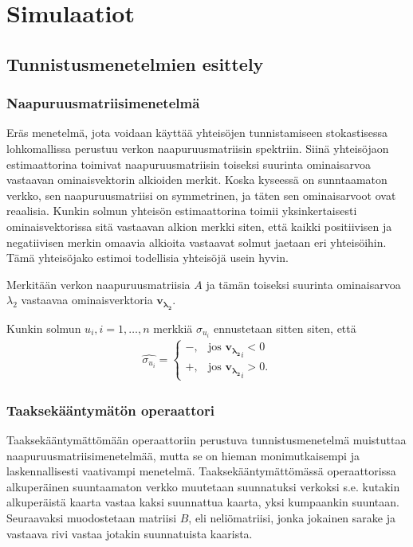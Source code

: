 \documentclass[finnish,12pt,a4paper,pdftex,sci,utf8]{aaltothesis}
\begin{document}
\section{Simulaatiot}
\subsection{Tunnistusmenetelmien esittely}
\subsubsection{Naapuruusmatriisimenetelmä}
Eräs menetelmä, jota voidaan käyttää yhteisöjen tunnistamiseen stokastisessa lohkomallissa perustuu verkon naapuruusmatriisin spektriin. Siinä yhteisöjaon estimaattorina toimivat naapuruusmatriisin toiseksi suurinta ominaisarvoa vastaavan ominaisvektorin alkioiden merkit. Koska kyseessä on sunntaamaton verkko, sen naapuruusmatriisi on symmetrinen, ja täten sen ominaisarvoot ovat reaalisia. Kunkin solmun yhteisön estimaattorina toimii yksinkertaisesti ominaisvektorissa sitä vastaavan alkion merkki siten, että kaikki positiivisen ja negatiivisen merkin omaavia alkioita vastaavat solmut jaetaan eri yhteisöihin. Tämä yhteisöjako estimoi todellisia yhteisöjä usein hyvin.

Merkitään verkon naapuruusmatriisia $A$ ja tämän toiseksi suurinta ominaisarvoa $\lambda_2$ vastaavaa ominaisverktoria $\mathbf{v_{\lambda_2}}$.

Kunkin solmun $u_i, i = 1, \ldots, n$ merkkiä $\sigma_{u_i}$ ennustetaan sitten siten, että 
\begin{align*}
	\hat{\sigma_{u_i}} = 
	\begin{cases}
		-, & \text{jos } \mathbf{v_{\lambda_2}}_i < 0 \\
		+, & \text{jos } \mathbf{v_{\lambda_2}}_i > 0.
	\end{cases}
\end{align*}

\subsubsection{Taaksekääntymätön operaattori}
Taaksekääntymättömään operaattoriin perustuva tunnistusmenetelmä muistuttaa naapuruusmatriisimenetelmää, mutta se on hieman monimutkaisempi ja laskennallisesti vaativampi menetelmä. Taaksekääntymättömässä operaattorissa alkuperäinen suuntaamaton verkko muutetaan suunnatuksi verkoksi s.e. kutakin alkuperäistä kaarta vastaa kaksi suunnattua kaarta, yksi kumpaankin suuntaan. Seuraavaksi muodostetaan matriisi $B$, eli neliömatriisi, jonka jokainen sarake ja vastaava rivi vastaa jotakin suunnatuista kaarista. 
\end{document}
